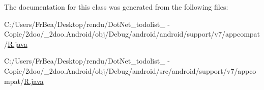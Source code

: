 The documentation for this class was generated from the following files:\begin{CompactItemize}
\item 
C:/Users/FrBea/Desktop/rendu/DotNet\_\-todolist\_ - Copie/2doo/\_\-2doo.Android/obj/Debug/android/android/support/v7/appcompat/\hyperlink{android_2support_2v7_2appcompat_2_r_8java}{R.java}\item 
C:/Users/FrBea/Desktop/rendu/DotNet\_\-todolist\_ - Copie/2doo/\_\-2doo.Android/obj/Debug/android/src/android/support/v7/appcompat/\hyperlink{src_2android_2support_2v7_2appcompat_2_r_8java}{R.java}\end{CompactItemize}
